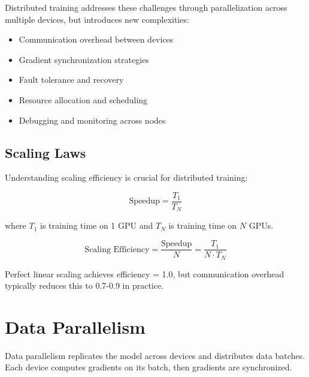 Distributed training addresses these challenges through parallelization across multiple devices, but introduces new complexities:

\begin{itemize}
    \item Communication overhead between devices
    \item Gradient synchronization strategies
    \item Fault tolerance and recovery
    \item Resource allocation and scheduling
    \item Debugging and monitoring across nodes
\end{itemize}

\subsection{Scaling Laws}

Understanding scaling efficiency is crucial for distributed training:

\begin{equation}
\text{Speedup} = \frac{T_1}{T_N}
\end{equation}

where $T_1$ is training time on 1 GPU and $T_N$ is training time on $N$ GPUs.

\begin{equation}
\text{Scaling Efficiency} = \frac{\text{Speedup}}{N} = \frac{T_1}{N \cdot T_N}
\end{equation}

Perfect linear scaling achieves efficiency = 1.0, but communication overhead typically reduces this to 0.7-0.9 in practice.

\section{Data Parallelism}

Data parallelism replicates the model across devices and distributes data batches. Each device computes gradients on its batch, then gradients are synchronized.

